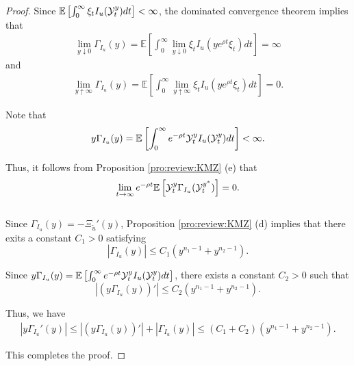 \documentclass[a4paper,report, 11pt]{article}
\begin{document}
\begin{proof}
	Since $\mathbb{E}\left[\int_0^\infty \xi_t I_u({\cal Y}_t^y)dt \right]<\infty$, the dominated convergence theorem implies that 
	\begin{align*}   
	\lim_{y\downarrow 0}\Gamma_{I_u}(y) =\mathbb{E}\left[\int_0^\infty \lim_{y\downarrow 0} \xi_t I_u(ye^{\rho t}{\xi}_t)dt\right]=\infty
	\end{align*}
	and 
	\begin{align*}
	\lim_{y\uparrow \infty}\Gamma_{I_u}(y) =\mathbb{E}\left[\int_0^\infty \lim_{y\uparrow \infty} \xi_t I_u(ye^{\rho t}{\xi}_t)dt\right]=0.
	\end{align*}
	
	 Note that 
	\begin{equation*}
	y\Gamma_{I_u}(y) = \mathbb{E}\left[\int_0^\infty e^{-\rho t}{\cal Y}_t^y I_u({\cal Y}_t^y)dt\right]<\infty.
	\end{equation*}
	
	Thus, it follows from Proposition \ref{pro:review:KMZ} (e) that 
	$$\lim_{t\to\infty} e^{-\rho t} \mathbb{E}\left[{\cal Y}_t^y \Gamma_{I_u}({\cal Y}_t^{y^*})\right]=0.$$\\
	
	Since $\Gamma_{I_u}(y) = -\Xi_{\tilde{u}}'(y)$, Proposition \ref{pro:review:KMZ} (d) implies that there exits a constant $C_1>0$ satisfying  
	\begin{equation}\label{eq:Gamma-prime-1}
	|\Gamma_{I_u}(y)| \le C_1 (y^{n_1-1}+y^{n_2-1}). 
	\end{equation}
	
Since $y\Gamma_{I_u}(y) = \mathbb{E}\left[\int_0^\infty e^{-\rho t}{\cal Y}_t^y I_u({\cal Y}_t^y)dt\right]$,  there exists a constant $C_2>0$ such that 
	\begin{equation}\label{eq:Gamma-prime-2}
	|(y\Gamma_{I_u}(y))'| \le C_2 (y^{n_1-1}+y^{n_2-1}).
	\end{equation}
	 
	Thus, we have 
	\begin{align*}
	|y\Gamma_{I_u}'(y)|\le |(y\Gamma_{I_u}(y))'| + |\Gamma_{I_u}(y)| \le (C_1+C_2)(y^{n_1-1}+y^{n_2-1}).
	\end{align*}
	
	This completes the proof. 
	
\end{proof}
\end{document}
